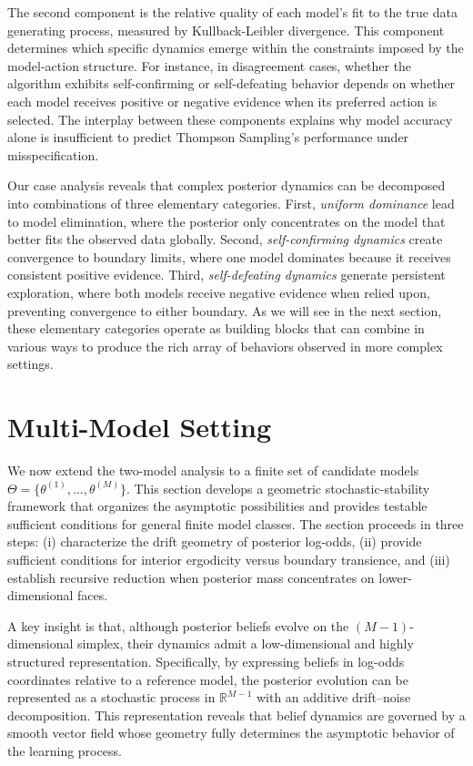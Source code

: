 \documentclass[12pt]{article}
\begin{document}
The second component is the relative quality of each model's fit to the true data generating process, measured by Kullback-Leibler divergence. This component determines which specific dynamics emerge within the constraints imposed by the model-action structure. For instance, in disagreement cases, whether the algorithm exhibits self-confirming or self-defeating behavior depends on whether each model receives positive or negative evidence when its preferred action is selected. The interplay between these components explains why model accuracy alone is insufficient to predict Thompson Sampling's performance under misspecification.

Our case analysis reveals that complex posterior dynamics can be decomposed into combinations of three elementary categories. First, \emph{uniform dominance} lead to model elimination, where the posterior only concentrates on the model that better fits the observed data globally. Second, \emph{self-confirming dynamics} create convergence to boundary limits, where one model dominates because it receives consistent positive evidence. Third, \emph{self-defeating dynamics} generate persistent exploration, where both models receive negative evidence when relied upon, preventing convergence to either boundary. As we will see in the next section, these elementary categories operate as building blocks that can combine in various ways to produce the rich array of behaviors observed in more complex settings.


\section{Multi-Model Setting}
\label{sec:multi-model-setting}

We now extend the two-model analysis to a finite set of candidate models
$\Theta = \{\theta^{(1)}, \ldots, \theta^{(M)}\}$. This section develops a geometric stochastic-stability framework that organizes the asymptotic possibilities and provides testable sufficient conditions for general finite model classes. The section proceeds in three steps: (i) characterize the drift geometry of posterior log-odds, (ii) provide sufficient conditions for interior ergodicity versus boundary transience, and (iii) establish recursive reduction when posterior mass concentrates on lower-dimensional faces.

A key insight is that, although posterior beliefs evolve on the $(M-1)$-dimensional simplex, their dynamics admit a low-dimensional and highly structured representation.
Specifically, by expressing beliefs in log-odds coordinates relative to a reference model, the posterior evolution can be represented as a stochastic process in $\mathbb{R}^{M-1}$ with an additive drift--noise decomposition.
This representation reveals that belief dynamics are governed by a smooth vector field whose geometry fully determines the asymptotic behavior of the learning process.
\end{document}

